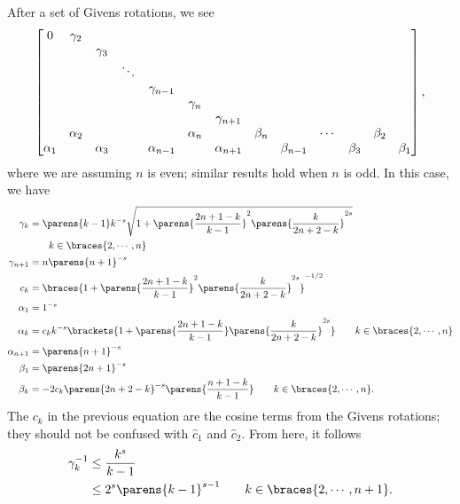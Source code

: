 After a set of Givens rotations, we see
%
\begin{equation}
    \setcounter{MaxMatrixCols}{20}
    \begin{bmatrix}
        0 & \gamma_{2} & \\
        & & \gamma_{3} & \\
        & & & \ddots & \\
        & & & & \gamma_{n-1} \\
        & & & & & \gamma_{n} \\
        & & & & & & \gamma_{n+1} \\
        & \alpha_{2} & & & & \alpha_{n} & & \beta_{n} & &
            \cdots & & \beta_{2} & \\
        \alpha_{1} & & \alpha_{3} & & \alpha_{n-1} & & \alpha_{n+1} &
            & \beta_{n-1} & & \beta_{3} & & \beta_{1} \\
    \end{bmatrix},
\end{equation}
%
where we are assuming $n$ is even; similar results hold when $n$ is odd.
In this case, we have
%
\begin{align}
    \gamma_{k} &= \parens{k-1}k^{-s}\sqrt{1 + \parens{\frac{2n+1-k}{k-1}}^{2}
            \parens{\frac{k}{2n+2-k}}^{2s}} \nonumber\\
        &\qquad k\in\braces{2,\cdots,n} \nonumber\\
    \gamma_{n+1} &= n\parens{n+1}^{-s} \nonumber\\
    c_{k} &= \braces{1 + \parens{\frac{2n+1-k}{k-1}}^{2}\parens{
        \frac{k}{2n+2-k}}^{2s}}^{-1/2} \nonumber\\
    \alpha_{1} &= 1^{-s} \nonumber\\
    \alpha_{k} &= c_{k}k^{-s}\brackets{1 + \parens{\frac{2n+1-k}{k-1}}
        \parens{\frac{k}{2n+2-k}}^{2s}} \qquad k\in\braces{2,\cdots,n}
            \nonumber\\
    \alpha_{n+1} &= \parens{n+1}^{-s} \nonumber\\
    \beta_{1} &= \parens{2n+1}^{-s} \nonumber\\
    \beta_{k} &= -2c_{k}\parens{2n+2-k}^{-s}\parens{\frac{n+1-k}{k-1}}
        \qquad k\in\braces{2,\cdots,n}.
\end{align}
%
The $c_{k}$ in the previous equation are the cosine terms from the
Givens rotations; they should not be confused with
$\hat{c}_{1}$ and $\hat{c}_{2}$.
From here, it follows
%
\begin{align}
    \gamma_{k}^{-1} &\le \frac{k^{s}}{k-1} \nonumber\\
        &\le 2^{s}\parens{k-1}^{s-1} \qquad k\in\braces{2,\cdots,n+1}.
    \label{eq:birkhoff_bdy_gamma_bound}
\end{align}
